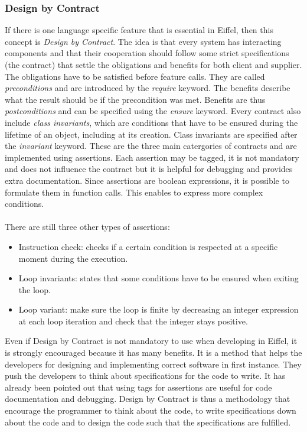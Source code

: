 \documentclass[12pt,a4paper,twocolumn]{article}
\begin{document}
\subsubsection{Design by Contract}
If there is one language specific feature that is essential in Eiffel, then this concept is \emph{Design by Contract}. The idea is that every system has interacting components and that their cooperation should follow some strict specifications (the contract) that settle the obligations and benefits for both client and supplier. The obligations have to be satisfied before feature calls. They are called \emph{preconditions} and are introduced by the \emph{require} keyword. The benefits describe what the result should be if the precondition was met. Benefits are thus \emph{postconditions} and can be specified using the \emph{ensure} keyword. Every contract also include \emph{class invariants}, which are conditions that have to be ensured during the lifetime of an object, including at its creation. Class invariants are specified after the \emph{invariant} keyword. These are the three main catergories of contracts and are implemented using assertions. Each assertion may be tagged, it is not mandatory and does not influence the contract but it is helpful for debugging and provides extra documentation. Since assertions are boolean expressions, it is possible to formulate them in function calls. This enables to express more complex conditions.
\\
\\
There are still three other types of assertions: 
\begin{itemize}
\item Instruction check: checks if a certain condition is respected at a specific moment during the execution.
\item Loop invariants: states that some conditions have to be ensured when exiting the loop.
\item Loop variant: make sure the loop is finite by decreasing an integer expression at each loop iteration and check that the integer stays positive.
\end{itemize}
Even if Design by Contract is not mandatory to use when developing in Eiffel, it is strongly encouraged because it has many benefits. It is a method that helps the developers for designing and implementing correct software in first instance. They push the developers to think about specifications for the code to write. It has already been pointed out that using tags for assertions are useful for code documentation and debugging. Design by Contract is thus a methodology that encourage the programmer to think about the code, to write specifications down about the code and to design the code such that the specifications are fulfilled.
\end{document}
